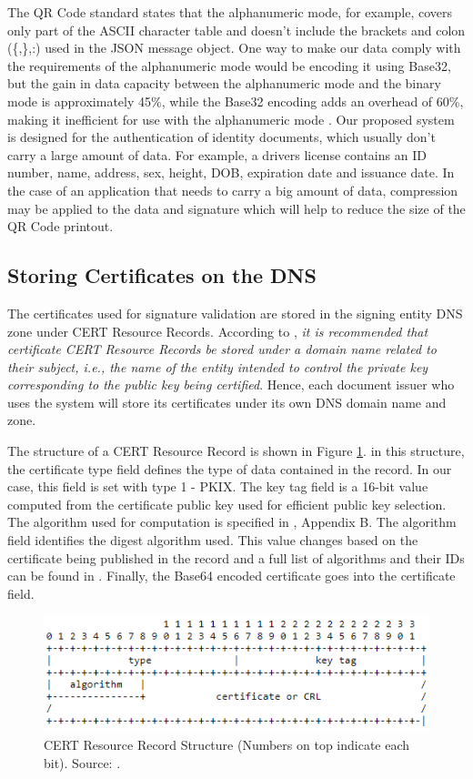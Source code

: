 \documentclass[12pt]{article}
\begin{document}
The QR Code standard states that the alphanumeric mode, for example, covers only part of the ASCII character table and doesn't include the brackets and colon (\{,\},:) used in the JSON message object. One way to make our data comply with the requirements of the alphanumeric mode would be encoding it using Base32, but the gain in data capacity between the alphanumeric mode and the binary mode is approximately 45\%, while the Base32 encoding adds an overhead of 60\%, making it inefficient for use with the alphanumeric mode \cite{josefsson2006base16}. 
Our proposed system is designed for the authentication of identity documents, which usually don't carry a large amount of data. For example, a drivers license contains an ID number, name, address, sex, height, DOB, expiration date and issuance date. In the case of an application that needs to carry a big amount of data, compression may be applied to the data and signature which will help to reduce the size of the QR Code printout. 

\subsection{Storing Certificates on the DNS}

The certificates used for signature validation are stored in the signing entity DNS zone under CERT Resource Records. According to \cite{josefsson2006storing}, \emph{it is recommended that certificate CERT Resource Records be stored under a domain name related to their subject, i.e., the name of the entity intended to control the private key corresponding to the public key being certified}. Hence, each document issuer who uses the system will store its certificates under its own DNS domain name and zone. 

The structure of a CERT Resource Record is shown in Figure \ref{fig:certrr}. in this structure, the certificate type field defines the type of data contained in the record. In our case, this field is set with type 1 - PKIX. The key tag field is a 16-bit value computed from the certificate public key used for efficient public key selection. The algorithm used for computation is specified in \cite{arends2008rfc}, Appendix B. The algorithm field identifies the digest algorithm used. This value changes based on the certificate being published in the record and a full list of algorithms and their IDs can be found in \cite{iana_domain_2017}. Finally, the Base64 encoded certificate goes into the certificate field.

\begin{figure}[ht]
    \centering
    \includegraphics[width=.8\textwidth]{certrr.png}
    \caption{CERT Resource Record Structure (Numbers on top indicate each bit). Source: \cite{josefsson2006storing}.}
    \label{fig:certrr}
\end{figure}
\end{document}

